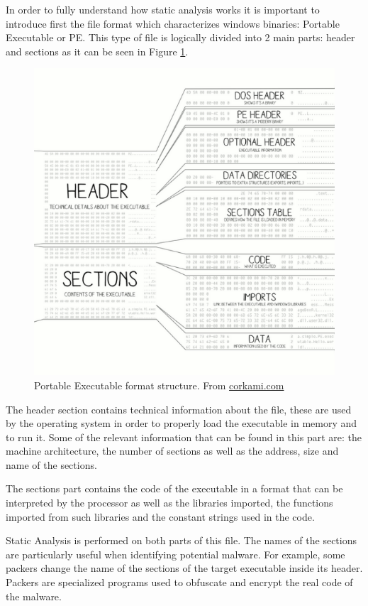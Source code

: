 In order to fully understand how static analysis works it is important to introduce first the file format which characterizes windows binaries: Portable Executable or PE. This type of file is logically divided into 2 main parts: header and sections as it can be seen in Figure \ref{fig:pe}.

\begin{figure}[ht]
\centering
\includegraphics[width=\linewidth]{images/pediv.png}
\caption{Portable Executable format structure. From \url{corkami.com}}
\label{fig:pe}
\end{figure}

The header section contains technical information about the file, these are used by the operating system in order to properly load the executable in memory and to run it. Some of the relevant information that can be found in this part are: the machine architecture, the number of sections as well as the address, size and name of the sections.

The sections part contains the code of the executable in a format that can be interpreted by the processor as well as the libraries imported, the functions imported from such libraries and the constant strings used in the code.

Static Analysis is performed on both parts of this file. The names of the sections are particularly useful when identifying potential malware. For example, some packers change the name of the sections of the target executable inside its header. Packers are specialized programs used to obfuscate and encrypt the real code of the malware.


